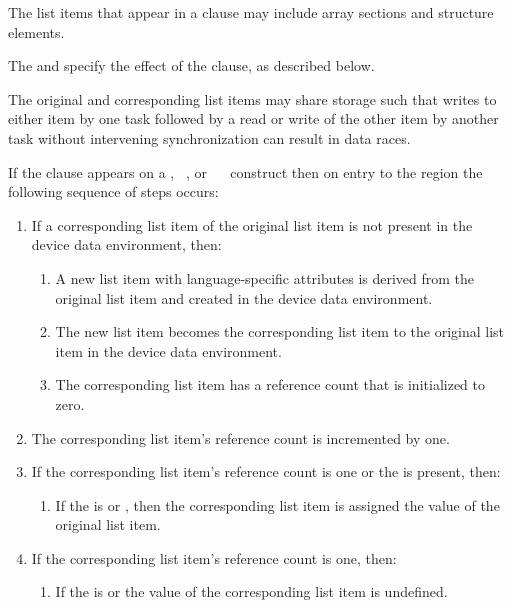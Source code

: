 \descr
The list items that appear in a  clause may include array sections and structure elements.

The  and  specify the effect of the  clause, as described below.

The original and corresponding list items may share storage such that writes to either
item by one task followed by a read or write of the other item by another task without
intervening synchronization can result in data races.

If the  clause appears on a , ~, or ~~ construct then on entry to the region the following sequence of steps occurs:
\begin{enumerate}
\item If a corresponding list item of the original list item is not present in the device data environment, then:
\begin{enumerate}
\item A new list item with language-specific attributes is derived from the original list item and created in the device data environment.
\item The new list item becomes the corresponding list item to the original list item in the device data environment.
\item The corresponding list item has a reference count that is initialized to zero. 
\end{enumerate}
\item The corresponding list item's reference count is incremented by one.
\item If the corresponding list item's reference count is one or the   is present, then:
\begin{enumerate}
\item If the  is  or , then the corresponding list item is assigned the value of the original list item. 
\end{enumerate}
\item If the corresponding list item's reference count is one, then:
\begin{enumerate}
\item If the  is  or  the value of the corresponding list item is undefined. 
\end{enumerate}
\end{enumerate}

